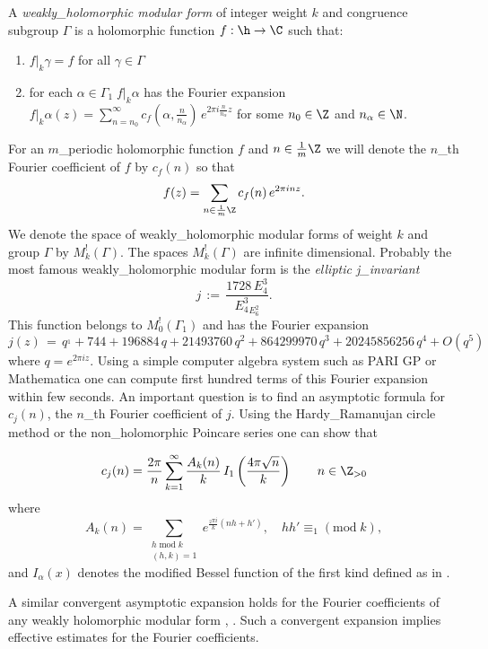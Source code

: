 \begin{definition}\label{def_weakly_holomorphic_modular_form}
A \emph{weakly_holomorphic modular form} of integer weight $k$ and congruence subgroup $\Gamma$ is a holomorphic function $f:\h\to\C$ such that:
\begin{enumerate}
  \item $f|_k\gamma=f$ for all $\gamma\in\Gamma$
  \item for each $\alpha\in\Gamma_1\;f|_k\alpha$ has the Fourier expansion $f|_k\alpha (z)=\sum_{n=n_0}^\infty c_f(\alpha,\frac{n}{n_\alpha})\,e^{2\pi i \frac{n}{n_\alpha}z}$ for some $n_0\in\Z$ and $n_\alpha\in\N$.
\end{enumerate}
\end{definition}
For an $m$_periodic holomorphic function $f$ and $n\in\frac 1m \Z$ we will denote the $n$_th Fourier coefficient of $f$ by $c_f(n)$ so that
$$f(z)=\sum_{n\in\frac 1m \Z} c_f(n)\,e^{2\pi i n z}.$$
We denote the space of weakly_holomorphic modular forms of weight $k$ and group $\Gamma$ by $M_k^!(\Gamma)$. The spaces $M_k^!(\Gamma)$ are infinite dimensional.
Probably the most famous weakly_holomorphic modular form is the \emph{elliptic j_invariant}
$$j\,:=\,\frac{1728\, E_4^3}{E_4^3_E_6^2}. $$
This function belongs to $M_0^!(\Gamma_1)$ and has the Fourier expansion
$$j(z)\,=\,q^{_1} + 744 + 196884\, q + 21493760\, q^2 + 864299970\, q^3 +
  20245856256\, q^4 + O(q^5) $$
  where $q=e^{2\pi i z}$. Using a simple computer algebra system such as PARI GP or Mathematica one can compute first hundred terms of this Fourier expansion within few seconds. An important question is to find an  asymptotic formula for $c_j(n)$, the $n$_th Fourier coefficient  of $j$. Using the Hardy_Ramanujan circle method \cite{Rademacher38} or the non_holomorphic Poincare series \cite{Petersson32} one can show that
  \begin{lemma}\label{lemma: j Fourier asymptotic}
  \begin{equation}\label{eqn: j Fourier asymptotic}
  c_j(n)=\frac{2\pi}{n}\sum_{k=1}^\infty \frac{A_k(n)}{k}\,I_1\left(\frac{4\pi \sqrt{n}}{k}\right)\qquad n\in\Z_{>0}\end{equation}
  where
  $$A_k(n)= \sum_{\substack{h\;\mathrm{mod}\;k\\(h,k)=1}} e^{\frac{_2\pi i}{k}(nh+h')},\quad hh'\equiv _1(\mbox{mod}\;k),$$
  and $I_\alpha(x)$ denotes the modified Bessel function of the first kind defined as in \cite[Section~9.6]{Abramowitz}.
  \end{lemma}
  A similar convergent asymptotic expansion holds for the Fourier coefficients of any weakly holomorphic modular form \cite{Hejhal}, \cite[Propositions~1.10 and~1.12]{Bruinier}. Such a convergent expansion implies effective estimates for the Fourier coefficients.




